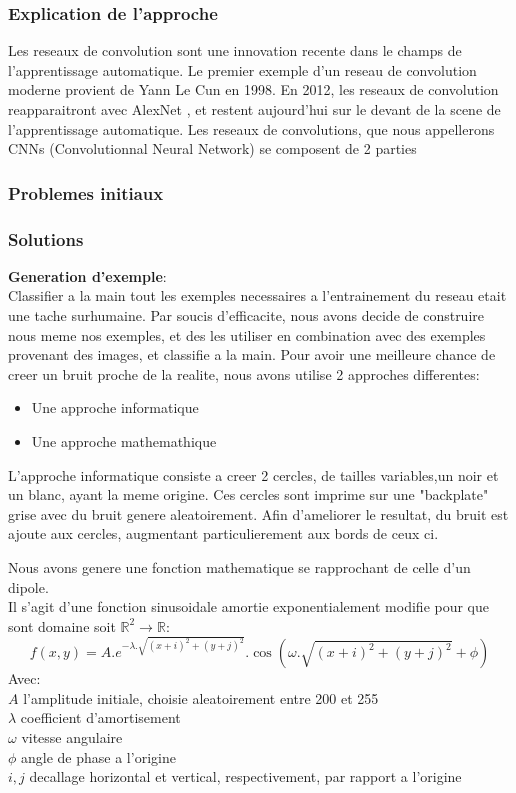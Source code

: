 \documentclass[a4paper, 12pt, titlepage, oneside]{article}
\begin{document}
	\subsubsection{Explication de l'approche}
	Les reseaux de convolution sont une innovation recente dans le champs de l'apprentissage automatique. Le premier exemple d'un reseau de convolution moderne provient de Yann Le Cun \cite{lecun-01a} en 1998. En 2012, les reseaux de convolution reapparaitront avec AlexNet \cite{NIPS2012_4824}, et restent aujourd'hui sur le devant de la scene de l'apprentissage automatique. 
	Les reseaux de convolutions, que nous appellerons CNNs (Convolutionnal Neural Network) se composent de 2 parties
	\subsubsection{Problemes initiaux}
	\subsubsection{Solutions}
	\textbf{Generation d'exemple}:\\
	Classifier a la main tout les exemples necessaires a l'entrainement du reseau etait une tache surhumaine. Par soucis d'efficacite, nous avons decide de construire nous meme
	nos exemples, et des les utiliser en combination avec des exemples provenant des images, et classifie a la main.
	Pour avoir une meilleure chance de creer un bruit proche de la realite, nous avons utilise 2 approches differentes:
	\begin{itemize}
		\item Une approche informatique
		\item Une approche mathemathique
	\end{itemize}
	L'approche informatique consiste a creer 2 cercles, de tailles variables,un noir et un blanc, ayant la meme origine. Ces cercles sont imprime sur une "backplate" grise avec du bruit genere aleatoirement. Afin d'ameliorer le resultat, du bruit est ajoute aux cercles, augmentant particulierement aux bords de ceux ci.

	Nous avons genere une fonction mathematique se rapprochant de celle d'un dipole.\\
	Il s'agit d'une fonction sinusoidale amortie exponentialement modifie pour que sont domaine soit $\mathbb{R}^2 \to \mathbb{R}$:
	\[f(x,y) = A.e^{-\lambda . \sqrt{(x+i)^2+(y+j)^2}}.\cos(\omega . \sqrt{(x+i)^2+(y+j)^2} + \phi)\]
	Avec:\\
	\indent $A$ l'amplitude initiale, choisie aleatoirement entre 200 et 255\\
	\indent$\lambda$ coefficient d'amortisement\\
	\indent$\omega$ vitesse angulaire\\
	\indent$\phi$ angle de phase a l'origine\\
	\indent$i,j$ decallage horizontal et vertical, respectivement, par rapport a l'origine
\end{document}
